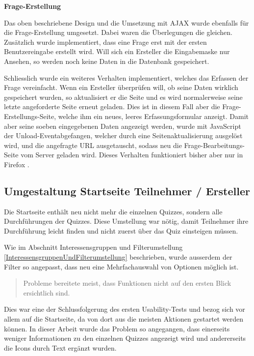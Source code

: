 \bigskip\bigskip

\textbf{Frage-Erstellung}

\bigskip

Das oben beschriebene Design und die Umsetzung mit AJAX wurde ebenfalls für die Frage-Erstellung umgesetzt. Dabei waren die Überlegungen die gleichen. \\

Zusätzlich wurde implementiert, dass eine Frage erst mit der ersten Benutzereingabe erstellt wird. Will sich ein Ersteller die Eingabemaske nur Ansehen, so werden noch keine Daten in die Datenbank gespeichert.

Schliesslich wurde ein weiteres Verhalten implementiert, welches das Erfassen der Frage vereinfacht. Wenn ein Ersteller überprüfen will, ob seine Daten wirklich gespeichert wurden, so aktualisiert er die Seite und es wird normalerweise seine letzte angeforderte Seite erneut geladen. Dies ist in diesem Fall aber die Frage-Erstellungs-Seite, welche ihm ein neues, leeres Erfassungsformular anzeigt. Damit aber seine soeben eingegebenen Daten angezeigt werden, wurde mit JavaScript der \glqq Unload-Event\grqq abgefangen, welcher durch eine Seitenaktualisierung ausgelöst wird, und die angefragte \gls{URL} ausgetauscht, sodass neu die Frage-Bearbeitungs-Seite vom Server geladen wird.
Dieses Verhalten funktioniert bisher aber nur in Firefox \cite{firefox}.



\subsection{Umgestaltung Startseite Teilnehmer / Ersteller}

Die Startseite enthält neu nicht mehr die einzelnen Quizzes, sondern alle Durchführungen der Quizzes. Diese Umstellung war nötig, damit Teilnehmer ihre Durchführung leicht finden und nicht zuerst über das Quiz einsteigen müssen.

Wie im Abschnitt Interessensgruppen und Filterumstellung \ref{InteressensgruppenUndFilterumstellung} beschrieben, wurde ausserdem der Filter so angepasst, dass neu eine Mehrfachauswahl von Optionen möglich ist.

\bigskip\bigskip

\begin{quote}
\glqq Probleme bereitete meist, dass Funktionen nicht auf den ersten Blick ersichtlich sind.\grqq
\end{quote}

Dies war eine der Schlussfolgerung des ersten \gls{Usability-Test}s und bezog sich vor allem auf die Startseite, da von dort aus die meisten Aktionen gestartet werden können. In dieser Arbeit wurde das Problem so angegangen, dass einerseits weniger Informationen zu den einzelnen Quizzes angezeigt wird und andererseits die Icons durch Text ergänzt wurden.

